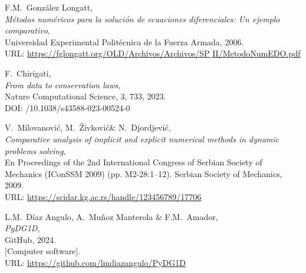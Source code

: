 \documentclass[11pt,a4paper,twoside,pdf]{article}
\numberwithin{equation}{section}
\begin{document}
\begin{thebibliography}{100}
   F.M.~González Longatt, \\
  {\em Métodos numéricos para la solución de ecuaciones diferenciales: Un ejemplo comparativo},\\  
 Universidad Experimental Politécnica de la Fuerza Armada, 2006.\\
 URL: \href{https://fglongatt.org/OLD/Archivos/Archivos/SP_II/MetodoNumEDO.pdf}{https://fglongatt.org/OLD/Archivos/Archivos/SP$\_$II/MetodoNumEDO.pdf}

  F.~Chirigati, \\
  {\em From data to conservation laws},\\  
  Nature Computational Science, 3, 733, 2023.\\
  DOI: /10.1038/s43588-023-00524-0

   V.~Milovanović, M.~Živković\& N.~Djordjević, \\
  {\em Comparative analysis of implicit and explicit numerical methods in dynamic problems solving},\\ 
En Proceedings of the 2nd International Congress of Serbian Society of Mechanics (IConSSM 2009) (pp. M2-28:1–12). Serbian Society of Mechanics, 2009.\\
URL: \href{https://scidar.kg.ac.rs/handle/123456789/17706}{https://scidar.kg.ac.rs/handle/123456789/17706}

  L.M.~Díaz Angulo, A.~Muñoz Manterola \& F.M.~Amador, \\
  {\em PyDG1D},\\  
    GitHub, 2024.\\
  $[$Computer software$]$.\\
  URL: \href{https://github.com/lmdiazangulo/PyDG1D}{https://github.com/lmdiazangulo/PyDG1D}


\end{thebibliography}
\end{document}

